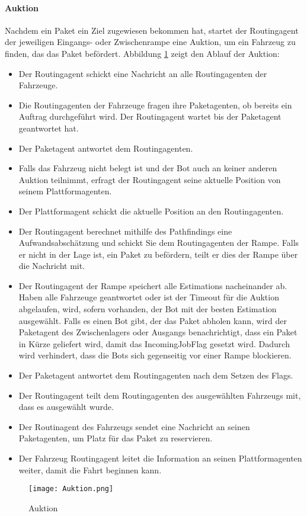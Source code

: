 \paragraph{Auktion}
Nachdem ein Paket ein Ziel zugewiesen bekommen hat, startet der Routingagent der jeweiligen Eingangs- oder Zwischenrampe eine Auktion, um ein Fahrzeug zu finden, das das Paket befördert. Abbildung \ref{Auktion} zeigt den Ablauf der Auktion:
\begin{itemize}
\item Der Routingagent schickt eine Nachricht an alle Routingagenten der Fahrzeuge.
\item Die Routingagenten der Fahrzeuge fragen ihre Paketagenten, ob bereits ein Auftrag durchgeführt wird. Der Routingagent wartet bis der Paketagent geantwortet hat.
\item Der Paketagent antwortet dem Routingagenten.
\item Falls das Fahrzeug nicht belegt ist und der Bot auch an keiner anderen Auktion teilnimmt, erfragt der Routingagent seine aktuelle Position von seinem Plattformagenten.
\item Der Plattformagent schickt die aktuelle Position an den Routingagenten.
\item Der Routingagent berechnet mithilfe des Pathfindings eine Aufwandsabschätzung und schickt Sie dem Routingagenten der Rampe. Falls er nicht in der Lage ist, ein Paket zu befördern, teilt er dies der Rampe über die Nachricht mit.
\item Der Routingagent der Rampe speichert alle Estimations nacheinander ab. Haben alle Fahrzeuge geantwortet oder ist der Timeout für die Auktion abgelaufen, wird, sofern vorhanden, der Bot mit der besten Estimation ausgewählt. Falls es einen Bot gibt, der das Paket abholen kann, wird der Paketagent des Zwischenlagers oder Ausgangs benachrichtigt, dass ein Paket in Kürze geliefert wird, damit das IncomingJobFlag gesetzt wird. Dadurch wird verhindert, dass die Bots sich gegenseitig vor einer Rampe blockieren.
\item Der Paketagent antwortet dem Routingagenten nach dem Setzen des Flags.
\item Der Routingagent teilt dem Routingagenten des ausgewählten Fahrzeugs mit, dass es ausgewählt wurde.
\item Der Routinagent des Fahrzeugs sendet eine Nachricht an seinen Paketagenten, um Platz für das Paket zu reservieren.
\item Der Fahrzeug Routingagent leitet die Information an seinen Plattformagenten weiter, damit die Fahrt beginnen kann.
\end{itemize}
\begin{figure}[h!]
	\centering
		\texttt{[image: Auktion.png]}        
		\caption{Auktion}
	\label{Auktion}
\end{figure}
